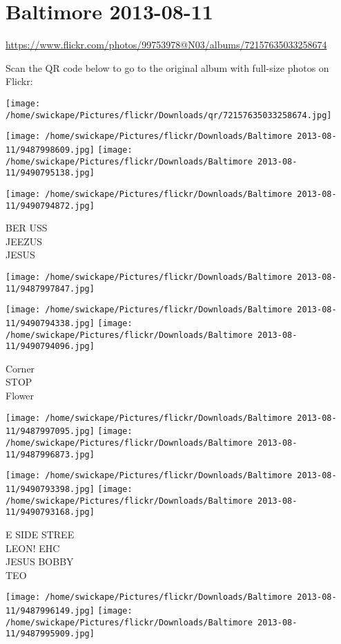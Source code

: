 \documentclass[10pt,letterpaper]{article}
\title{}
\author{}
\date{}
\begin{document}
\section*{Baltimore 2013-08-11}

\url{https://www.flickr.com/photos/99753978@N03/albums/72157635033258674}

Scan the QR code below to go to the original album with full-size photos on Flickr:

\texttt{[image: /home/swickape/Pictures/flickr/Downloads/qr/72157635033258674.jpg]}
\pagebreak

\texttt{[image: /home/swickape/Pictures/flickr/Downloads/Baltimore 2013-08-11/9487998609.jpg]}
\texttt{[image: /home/swickape/Pictures/flickr/Downloads/Baltimore 2013-08-11/9490795138.jpg]}

\texttt{[image: /home/swickape/Pictures/flickr/Downloads/Baltimore 2013-08-11/9490794872.jpg]}

BER USS\\
JEEZUS\\
JESUS
\pagebreak

\texttt{[image: /home/swickape/Pictures/flickr/Downloads/Baltimore 2013-08-11/9487997847.jpg]}

\vspace{0.25in}
\texttt{[image: /home/swickape/Pictures/flickr/Downloads/Baltimore 2013-08-11/9490794338.jpg]}
\texttt{[image: /home/swickape/Pictures/flickr/Downloads/Baltimore 2013-08-11/9490794096.jpg]}

Corner\\
STOP\\
Flower
\pagebreak

\texttt{[image: /home/swickape/Pictures/flickr/Downloads/Baltimore 2013-08-11/9487997095.jpg]}
\texttt{[image: /home/swickape/Pictures/flickr/Downloads/Baltimore 2013-08-11/9487996873.jpg]}

\texttt{[image: /home/swickape/Pictures/flickr/Downloads/Baltimore 2013-08-11/9490793398.jpg]}
\texttt{[image: /home/swickape/Pictures/flickr/Downloads/Baltimore 2013-08-11/9490793168.jpg]}

E SIDE STREE\\
LEON! EHC\\
JESUS BOBBY\\
TEO
\pagebreak

\texttt{[image: /home/swickape/Pictures/flickr/Downloads/Baltimore 2013-08-11/9487996149.jpg]}
\texttt{[image: /home/swickape/Pictures/flickr/Downloads/Baltimore 2013-08-11/9487995909.jpg]}
\end{document}
